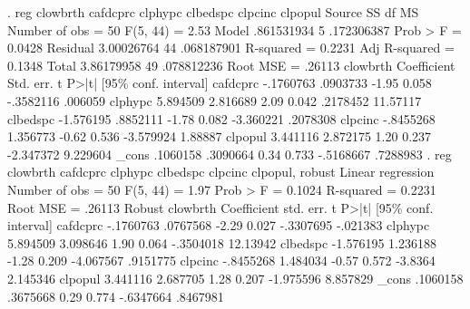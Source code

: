 . reg clowbrth cafdcprc clphypc clbedspc clpcinc clpopul
{\smallskip}
      Source {\VBAR}       SS           df       MS      Number of obs   =        50
   F(5, 44)        =      2.53
       Model {\VBAR}  .861531934         5  .172306387   Prob > F        =    0.0428
    Residual {\VBAR}  3.00026764        44  .068187901   R-squared       =    0.2231
   Adj R-squared   =    0.1348
       Total {\VBAR}  3.86179958        49  .078812236   Root MSE        =    .26113
{\smallskip}
    clowbrth {\VBAR} Coefficient  Std. err.      t    P>|t|     [95\% conf. interval]
    cafdcprc {\VBAR}  -.1760763   .0903733    -1.95   0.058    -.3582116     .006059
     clphypc {\VBAR}   5.894509   2.816689     2.09   0.042     .2178452    11.57117
    clbedspc {\VBAR}  -1.576195   .8852111    -1.78   0.082    -3.360221    .2078308
     clpcinc {\VBAR}  -.8455268   1.356773    -0.62   0.536    -3.579924     1.88887
     clpopul {\VBAR}   3.441116   2.872175     1.20   0.237    -2.347372    9.229604
       _cons {\VBAR}   .1060158   .3090664     0.34   0.733    -.5168667    .7288983
{\smallskip}
. reg clowbrth cafdcprc clphypc clbedspc clpcinc clpopul, robust
{\smallskip}
Linear regression                               Number of obs     =         50
                                                F(5, 44)          =       1.97
                                                Prob > F          =     0.1024
                                                R-squared         =     0.2231
                                                Root MSE          =     .26113
{\smallskip}
             {\VBAR}               Robust
    clowbrth {\VBAR} Coefficient  std. err.      t    P>|t|     [95\% conf. interval]
    cafdcprc {\VBAR}  -.1760763   .0767568    -2.29   0.027    -.3307695    -.021383
     clphypc {\VBAR}   5.894509   3.098646     1.90   0.064    -.3504018    12.13942
    clbedspc {\VBAR}  -1.576195   1.236188    -1.28   0.209    -4.067567    .9151775
     clpcinc {\VBAR}  -.8455268   1.484034    -0.57   0.572      -3.8364    2.145346
     clpopul {\VBAR}   3.441116   2.687705     1.28   0.207    -1.975596    8.857829
       _cons {\VBAR}   .1060158   .3675668     0.29   0.774    -.6347664    .8467981
{\smallskip}
